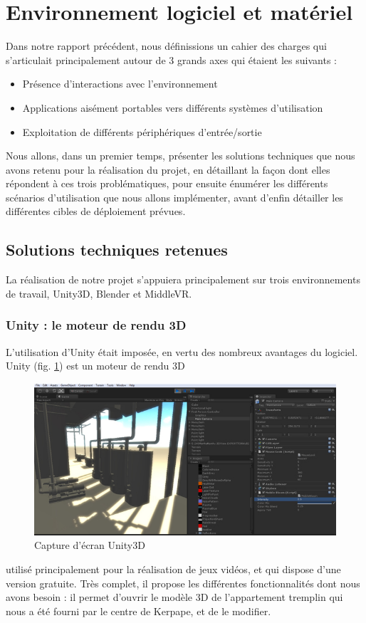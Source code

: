 \section{Environnement logiciel et matériel}

Dans notre rapport précédent, nous définissions un cahier des charges qui s'articulait principalement autour de 3 grands axes qui étaient les suivants : 
\begin{itemize}\renewcommand{\labelitemi}{$\bullet$}
\item Présence d'interactions avec l'environnement
\item Applications aisément portables vers différents systèmes d'utilisation
\item Exploitation de différents périphériques d'entrée/sortie
\end{itemize}
Nous allons, dans un premier temps, présenter les solutions techniques que nous avons retenu pour la réalisation du projet, en détaillant la façon dont elles répondent à ces trois problématiques, pour ensuite énumérer les différents scénarios d'utilisation que nous allons implémenter, avant d'enfin détailler les différentes cibles de déploiement prévues. 

\subsection{Solutions techniques retenues}
La réalisation de notre projet s'appuiera principalement sur trois environnements de travail, Unity3D, Blender et MiddleVR.

\subsubsection{Unity : le moteur de rendu 3D}
L'utilisation d'Unity était imposée, en vertu des nombreux avantages du logiciel. Unity (fig. \ref{screen_unity}) est un moteur de rendu 3D
\begin{figure}
	\centering
	\includegraphics[scale=0.5]{2-Specifications/img-utilisateur/screen_unity.jpg}
	\caption{Capture d'écran Unity3D}
	\label{screen_unity}
\end{figure}
utilisé principalement pour la réalisation de jeux vidéos, et qui dispose d'une version gratuite. Très complet, il propose les différentes fonctionnalités dont nous avons besoin : il permet d'ouvrir le modèle 3D de l'appartement tremplin qui nous a été fourni par le centre de Kerpape, et de le modifier. \newline

